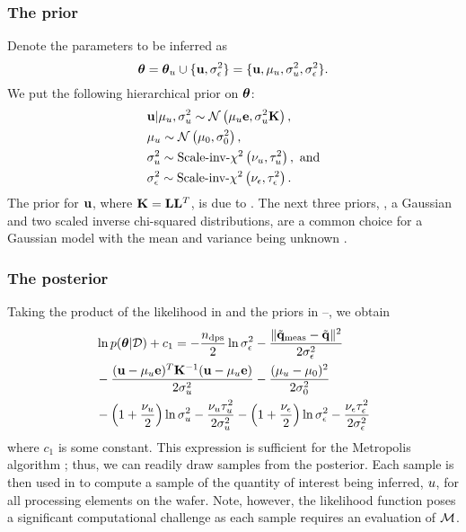\subsubsection{The prior}
Denote the parameters to be inferred as
\[
  {\boldsymbol\theta} = {\boldsymbol\theta}_u \cup \{ \mathbf{u}, \sigma_\epsilon^2 \} = \{ \mathbf{u}, \mu_u, \sigma_u^2, \sigma_\epsilon^2 \}.
\]
We put the following hierarchical prior on ${\boldsymbol\theta}$:
\begin{align}
  & \vu | \mu_\u, \sigma^2_\u \sim \gaussian{\mu_\u \vI}{\sigma^2_\u \mCov}, \elabel{u-prior} \\
  & \mu_\u \sim \gaussian{\mu_0}{\sigma^2_0}, \elabel{mu-u-prior} \\
  & \sigma^2_\u \sim \sichisquared{\nu_\u}{\tau^2_\u}, \text{ and} \elabel{sigma2-u-prior} \\
  & \sigma^2_\noise \sim \sichisquared{\nu_\noise}{\tau^2_\noise}. \elabel{sigma2-noise-prior}
\end{align}
The prior for $\mathbf{u}$, where $\mathbf{K} = \mathbf{L} \mathbf{L}^T$, is due to . The next three priors, \ie, a Gaussian and two scaled inverse chi-squared distributions, are a common choice for a Gaussian model with the mean and variance being unknown \cite{gelman2004}.

\subsubsection{The posterior}
Taking the product of the likelihood in  and the priors in --, we obtain
\begin{align}
  & \ln \f{\vparam | \Data} + c_1 = -\frac{\ndps}{2} \ln \sigma^2_\noise - \frac{\norm{\mvT_\meas - \mvT}^2}{2 \sigma^2_\noise} \nonumber \\
  & {} - \frac{(\vu - \mu_\u \vI)^T\mCov^{-1}(\vu - \mu_\u \vI)}{2 \sigma_\u^2} - \frac{(\mu_\u - \mu_0)^2}{2 \sigma^2_0} \nonumber \\
  & {} - \left(1 + \frac{\nu_\u}{2}\right) \ln \sigma^2_\u - \frac{\nu_\u \tau_\u^2}{2 \sigma^2_\u} - \left(1 + \frac{\nu_\noise}{2}\right) \ln \sigma^2_\noise - \frac{\nu_\noise \tau_\noise^2}{2 \sigma^2_\noise} \elabel{log-posterior}
\end{align}
where $c_1$ is some constant. This expression is sufficient for the Metropolis algorithm \cite{gelman2004}; thus, we can readily draw samples from the posterior. Each sample is then used in  to compute a sample of the quantity of interest being inferred, $u$, for all processing elements on the wafer. Note, however, the likelihood function poses a significant computational challenge as each sample requires an evaluation of $\model$.
